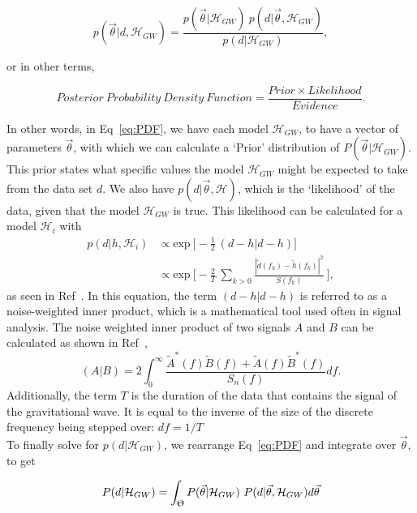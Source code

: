 \documentclass{article}
\begin{document}
\begin{equation} \label{eq:PDF}
p(\vec{\theta}|d, \mathcal{H}_{GW})  = \frac{p(\vec{\theta}| \mathcal{H}_{GW}) \ p(d|\vec{\theta},  \mathcal{H}_{GW})}  { p(d|\mathcal{H}_{GW})},
\end{equation} 

or in other terms, 

\begin{equation} \label{eq:englishTheorem}
{ Posterior \ Probability \ Density \ Function}  = \frac{ Prior  \times Likelihood}{Evidence}. \nonumber
\end{equation} 

In other words, in Eq~\ref{eq:PDF}, we have each model $ \mathcal{H}_{GW}$, to have a vector of parameters $\vec{\theta}$, with which we can calculate a `Prior' distribution of $P(\vec{\theta}| \mathcal{H}_{GW})$. This prior states what specific values the model $ \mathcal{H}_{GW}$ might be expected to take from the data set $d$. We also have $p(d|\vec{\theta},  \mathcal{H})$, which is the `likelihood' of the data, given that the model $ \mathcal{H}_{GW}$ is true. This likelihood can be calculated for a model $\mathcal{H}_{i}$ with
\begin{align}\label{eq:likelihood}
p(d|h, \mathcal{H}_{i}) & \propto \text{exp} \ \bigg[-\frac{1}{2} \ (d-h|d-h)\bigg] \nonumber \\ 
& \propto \text{exp} \ \bigg[-\frac{2}{T} \ \sum_{k>0} \frac{ | \tilde{d}(f_k) - \tilde{h}(f_k) | ^ 2 }{S(f_k)}\ \bigg],
\end{align}
as seen in Ref~\cite{BaeStats}. In this equation, the term $(d-h|d-h)$ is referred to as a noise-weighted inner product, which is a mathematical tool used often in signal analysis. The noise weighted inner product of two signals $A$ and $B$ can be calculated as shown in Ref~\cite{lindblom2008model}, $$(A|B) = 2 \int_{0}^{\infty} {\frac{\tilde{A}^* (f)  \tilde{B} (f)  +  \tilde{A} (f)  \tilde{B}^* (f) }{S_n(f)}}df. $$ Additionally, the term $T$ is the duration of the data that contains the signal of the gravitational wave. It is equal to the inverse of the size of the discrete frequency being stepped over: $df = 1/T$ \\





To finally solve for $p(d|\mathcal{H}_{GW})$, we rearrange Eq~\ref{eq:PDF} and integrate over $\vec{\theta}$, to get 

\begin{equation} \label{eq:evidence}
 P(d|\mathcal{H}_{GW})    = \int_{\Uptheta} P(\vec{\theta}| \mathcal{H}_{GW}) \ P(d|\vec{\theta},  \mathcal{H}_{GW}) d\vec{\theta}
\end{equation}
\end{document}

